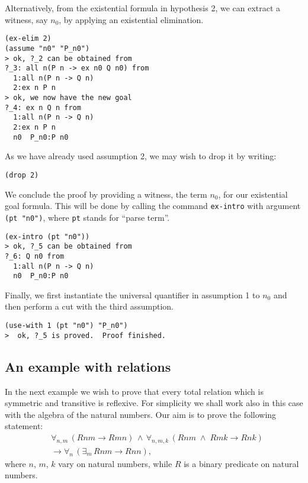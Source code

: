 \documentclass[12pt]{amsart}
\newcommand{\inquotes}[1]{``#1''}
\newcommand{\ob}{\to}
\begin{document}
Alternatively, from the existential formula in hypothesis 2, we can
extract a witness, say $n_0$, by applying an existential elimination.
\begin{verbatim}
(ex-elim 2)
(assume "n0" "P_n0")
> ok, ?_2 can be obtained from
?_3: all n(P n -> ex n0 Q n0) from
  1:all n(P n -> Q n)
  2:ex n P n
> ok, we now have the new goal
?_4: ex n Q n from
  1:all n(P n -> Q n)
  2:ex n P n
  n0  P_n0:P n0
\end{verbatim}
As we have already used assumption 2, we may wish to drop it by
writing:
\begin{verbatim}
(drop 2)
\end{verbatim}

We conclude the proof by providing a witness, the term $n_0$, for our
existential goal formula.  This will be done by calling the command
\texttt{ex-intro} with argument \texttt{(pt "n0")}, where \texttt{pt}
stands for \inquotes{parse term}.
\begin{verbatim}
(ex-intro (pt "n0"))
> ok, ?_5 can be obtained from
?_6: Q n0 from
  1:all n(P n -> Q n)
  n0  P_n0:P n0
\end{verbatim}

Finally, we first instantiate the universal quantifier in assumption 1
to $n_0$ and then perform a cut with the third assumption.
\begin{verbatim}
(use-with 1 (pt "n0") "P_n0")
>  ok, ?_5 is proved.  Proof finished.
\end{verbatim}


\subsection{An example with relations}
In the next example we wish to prove that every total relation which
is symmetric and transitive is reflexive.  For simplicity we shall
work also in this case with the algebra of the natural numbers.  Our
aim is to prove the following statement:
\begin{align*}
        &       \forall_{n,m}\, (R n m \ob R m n)
                \,\land\, \forall_{n, m, k}\,
                (R n m \;\land\; R m k \ob R n k)\\
        &       \ob \forall_n\, (\exists_m\, R n m \ob R n n),
\end{align*}
\noindent
where $n$, $m$, $k$ vary on natural numbers, while $R$ is a binary
predicate on natural numbers.
\end{document}
